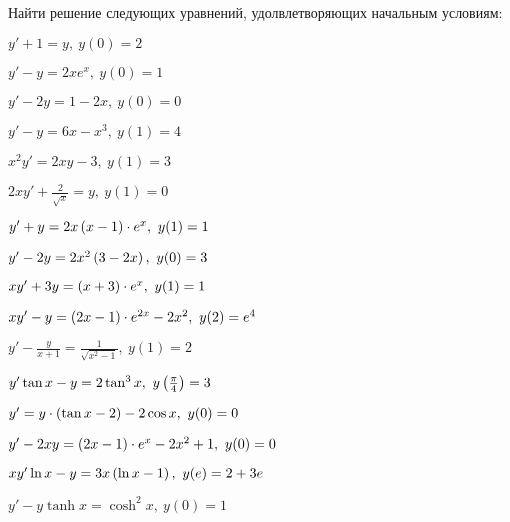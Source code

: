 	Найти решение следующих уравнений, удолвлетворяющих начальным условиям:
	\begin{multicols}{3}
		\begin{enumtasks}

			\label{firstorder:linear_cauchy}
			\item \( y' + 1 = y, ~ y(0) = 2 \) 																%
			\item \( y' - y = 2x e^{x}, ~ y(0) = 1 \) 														%
			\item \( y' - 2y = 1 - 2x, ~ y(0) = 0 \) 														%
			\item \( y' - y = 6x - x^3, ~ y(1) = 4 \) 														%
			\item \( x^2y' = 2xy - 3, ~ y(1) = 3 \) 														%
			\item \( 2xy' + \frac{2}{\sqrt{x}} = y, ~ y(1) = 0 \) 											%

		\end{enumtasks}
	\end{multicols}

	\begin{multicols}{2}
		\begin{enumtasks}

			\item \( y' + y = 2x \left( x - 1 \right) \cdot e^{x}, ~ y(1) = 1 \) 									%
			\item \( y' - 2y = 2x^2 \left( 3 - 2x \right), ~ y(0) = 3 \) 											%
			\item \( xy' + 3y = \left( x + 3 \right) \cdot e^{x}, ~ y(1) = 1 \) 									%
			\item \( xy' - y = \left( 2x - 1 \right) \cdot e^{2x} - 2x^2, ~ y(2) = e^4 \) 							%
			\item \( y' - \frac{y}{x + 1} = \frac{1}{\sqrt{x^2 - 1}}, ~ y(1) = 2 \) 						%
			\item \( y' \tan{x} - y = 2\tan^3{x}, ~ y \left( \frac{\pi}{4} \right) = 3 \) 							%
			\item \( y' = y \cdot \left( \tan{x} - 2 \right) - 2 \cos{x}, ~ y(0) = 0 \) 							%
			\item \( y' - 2xy = \left( 2x - 1 \right) \cdot e^{x} - 2x^2 + 1, ~ y(0) = 0 \) 						%
			\item \( xy' \ln{x} - y = 3x \left( \ln{x} - 1 \right), ~ y(e) = 2 + 3e \) 							%
			\item \( y' - y \tanh{x} = \cosh^2{x}, ~ y(0) = 1 \) 											%

		\end{enumtasks}
	\end{multicols}
	
